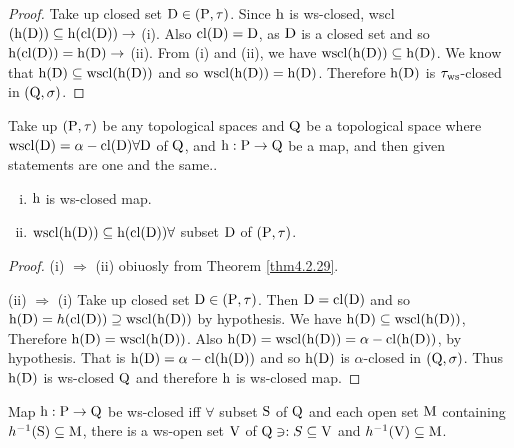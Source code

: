 \begin{proof}
Take up closed set $\mathrm{D} \in (\mathrm{P}, \tau)$. Since $\mathrm{h}$ is ws-closed, wscl $(\mathrm{h} (\mathrm{D})) \subseteq \mathrm{h} (\mathrm{cl} (\mathrm{D})) \to$ (i). Also $\mathrm{cl} (\mathrm{D}) = \mathrm{D}$, as $\mathrm{D}$ is a closed set and so $\mathrm{h} (\mathrm{cl}(\mathrm{D})) = \mathrm{h}(\mathrm{D}) \to$ (ii). From (i) and (ii), we have $\mathrm{wscl} (\mathrm{h} (\mathrm{D})) \subseteq \mathrm{h} (\mathrm{D})$. We know that $\mathrm{h} (\mathrm{D}) \subseteq \mathrm{ws} \mathrm{cl} (\mathrm{h} (\mathrm{D}))$ and so $\mathrm{wscl} (\mathrm{h} (\mathrm{D})) =\mathrm{h} (\mathrm{D})$. Therefore $\mathrm{h} (\mathrm{D})$ is $\tau_{\mathrm{ws}}$-closed in $(\mathrm{Q}, \sigma)$.
\end{proof}

\begin{thm}\label{thm4.2.30}
Take up $(\mathrm{P}, \tau)$ be any topological spaces and $\mathrm{Q}$ be a topological space where $\mathrm{wscl} (\mathrm{D}) = \alpha - \mathrm{cl} (\mathrm{D}) \forall \mathrm{D}$ of $\mathrm{Q}$, and $\mathrm{h}: \mathrm{P} \to \mathrm{Q}$ be a map, and then given statements are one and the same..
\begin{enumerate}[(i)]
\item $\mathrm{h}$ is ws-closed map.
\item $\mathrm{wscl} (\mathrm{h} (\mathrm{D})) \subseteq \mathrm{h} (\mathrm{cl} (\mathrm{D})) \forall$ subset $\mathrm{D}$ of $(\mathrm{P}, \tau)$.
\end{enumerate}
\end{thm}

\begin{proof}
(i) $\Rightarrow$ (ii) obiuosly from Theorem \ref{thm4.2.29}.

(ii) $\Rightarrow$ (i) Take up closed set $\mathrm{D} \in (\mathrm{P}, \tau)$. Then $\mathrm{D}=\mathrm{cl} (\mathrm{D})$ and so $\mathrm{h}(\mathrm{D}) = h(\mathrm{cl} (\mathrm{D})) \supseteq \mathrm{wscl} (\mathrm{h} (\mathrm{D}))$ by hypothesis. We have $\mathrm{h} (\mathrm{D}) \subseteq \mathrm{wscl} (\mathrm{h} (\mathrm{D}))$, Therefore $\mathrm{h} (\mathrm{D}) = \mathrm{wscl} (\mathrm{h} (\mathrm{D}))$. Also $\mathrm{h} (\mathrm{D}) = \mathrm{wscl} (\mathrm{h} (\mathrm{D})) = \alpha-\mathrm{cl} (\mathrm{h} (\mathrm{D}))$, by hypothesis. That is $\mathrm{h} (\mathrm{D}) = \alpha-\mathrm{cl} (\mathrm{h} (\mathrm{D}))$ and so $\mathrm{h} (\mathrm{D})$ is $\alpha$-closed in $(\mathrm{Q}, \sigma)$. Thus $\mathrm{h} (\mathrm{D})$ is ws-closed $\mathrm{Q}$ and therefore $\mathrm{h}$ is ws-closed map.
\end{proof}

\begin{thm}\label{thm4.2.31}
Map $\mathrm{h} : \mathrm{P} \to \mathrm{Q}$ be ws-closed iff $\forall$ subset $\mathrm{S}$ of $\mathrm{Q}$ and each open set $\mathrm{M}$ containing $h^{-1}(\mathrm{S}) \subseteq \mathrm{M}$, there is a ws-open set $\mathrm{V}$ of $\mathrm{Q} \ni: S \subseteq \mathrm{V}$ and $h^{-1} (\mathrm{V}) \subseteq \mathrm{M}$.
\end{thm}

